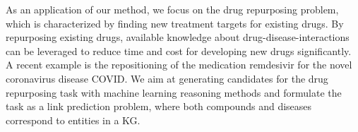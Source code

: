 \documentclass{article}
\begin{document}
As an application of our method, we focus on the drug repurposing problem, which is characterized by finding new treatment targets for existing drugs. By repurposing existing drugs, available knowledge about drug-disease-interactions can be leveraged to reduce time and cost for developing new drugs significantly. A recent example is the repositioning of the medication remdesivir for the novel coronavirus disease COVID. 
We aim at generating candidates for the drug repurposing task with machine learning reasoning methods and  formulate the task as a link prediction problem, where both compounds and diseases correspond to entities in a KG. 
\end{document}
